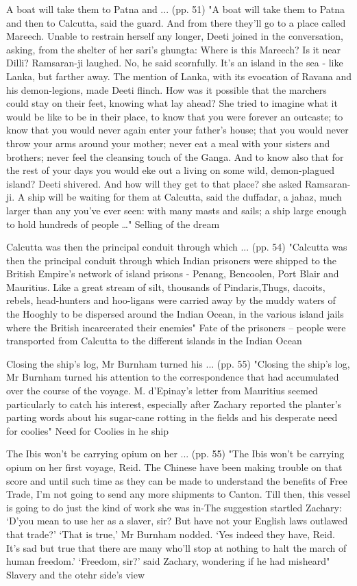 A boat will take them to Patna and ... (pp. 51)
"A boat will take them to Patna and then to Calcutta, said the guard. And from there they’ll go to a place called Mareech. Unable to restrain herself any longer, Deeti joined in the conversation, asking, from the shelter of her sari’s ghungta: Where is this Mareech? Is it near Dilli? Ramsaran-ji laughed. No, he said scornfully. It’s an island in the sea - like Lanka, but farther away. The mention of Lanka, with its evocation of Ravana and his demon-legions, made Deeti flinch. How was it possible that the marchers could stay on their feet, knowing what lay ahead? She tried to imagine what it would be like to be in their place, to know that you were forever an outcaste; to know that you would never again enter your father’s house; that you would never throw your arms around your mother; never eat a meal with your sisters and brothers; never feel the cleansing touch of the Ganga. And to know also that for the rest of your days you would eke out a living on some wild, demon-plagued island? Deeti shivered. And how will they get to that place? she asked Ramsaran-ji. A ship will be waiting for them at Calcutta, said the duffadar, a jahaz, much larger than any you’ve ever seen: with many masts and sails; a ship large enough to hold hundreds of people …"
Selling of the dream

Calcutta was then the principal conduit through which ... (pp. 54)
"Calcutta was then the principal conduit through which Indian prisoners were shipped to the British Empire’s network of island prisons - Penang, Bencoolen, Port Blair and Mauritius. Like a great stream of silt, thousands of Pindaris,Thugs, dacoits, rebels, head-hunters and hoo-ligans were carried away by the muddy waters of the Hooghly to be dispersed around the Indian Ocean, in the various island jails where the British incarcerated their enemies"
Fate of the prisoners -- people were transported from Calcutta to the different islands in the Indian Ocean

Closing the ship’s log, Mr Burnham turned his ... (pp. 55)
"Closing the ship’s log, Mr Burnham turned his attention to the correspondence that had accumulated over the course of the voyage. M. d’Epinay’s letter from Mauritius seemed particularly to catch his interest, especially after Zachary reported the planter’s parting words about his sugar-cane rotting in the fields and his desperate need for coolies"
Need for Coolies in he ship

The Ibis won’t be carrying opium on her ... (pp. 55)
"The Ibis won’t be carrying opium on her first voyage, Reid. The Chinese have been making trouble on that score and until such time as they can be made to understand the benefits of Free Trade, I’m not going to send any more shipments to Canton. Till then, this vessel is going to do just the kind of work she was in-The suggestion startled Zachary: ‘D’you mean to use her as a slaver, sir? But have not your English laws outlawed that trade?’ ‘That is true,’ Mr Burnham nodded. ‘Yes indeed they have, Reid. It’s sad but true that there are many who’ll stop at nothing to halt the march of human freedom.’ ‘Freedom, sir?’ said Zachary, wondering if he had misheard"
Slavery and the otehr side's view

